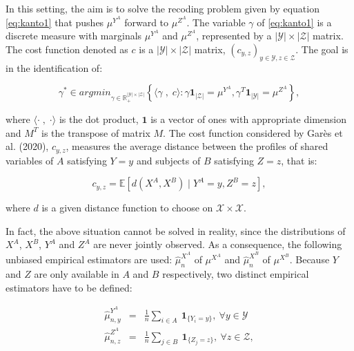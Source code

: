 In this setting, the aim is to solve the recoding problem given by equation \eqref{eq:kanto1} that pushes \(\mu^{Y^A}\) forward to \(\mu^{Z^A}\).
The variable \(\gamma\) of \eqref{eq:kanto1} is a discrete measure with marginals \(\mu^{Y^A}\) and \(\mu^{Z^A}\), represented by a \(|\mathcal{Y}| \times |\mathcal{Z}|\) matrix.
The cost function denoted as \(c\) is a \(|\mathcal{Y}| \times |\mathcal{Z}|\) matrix, \((c_{y,z})_{y\in \mathcal{Y},z\in \mathcal{Z}}\).
The goal is in the identification of:

\begin{equation}
\gamma^*\in argmin_{\gamma \in \mathbb{R}_+^{|\mathcal{Y}| \times |\mathcal{Z}|}}\left\{\langle \gamma  \; ,\; c \rangle : \gamma \mathbf{1}_{|\mathcal{Z}|} = \mu^{Y^A},\gamma^T \mathbf{1}_{|\mathcal{Y}|} = \mu^{Z^A}\right\},
\label{eq:modeldim}
\end{equation}

where \(\langle \cdot \;,\; \cdot \rangle\)
is the dot product, \(\mathbf{1}\) is a vector of ones with appropriate dimension and \(M^T\) is the transpose of matrix \(M\). The cost function considered by Garès et al. (2020), \(c_{y,z}\), measures the average distance between the profiles of shared variables of \(A\) satisfying \(Y=y\) and subjects of \(B\) satisfying \(Z=z\), that is:

\begin{equation}
c_{y,z} = \mathbb{E} \left[d(X^A,X^B) \mid Y^A= y, Z^B= z\right],
\label{eq:costgroup}
\end{equation}

where \(d\) is a given distance function to choose on \(\mathcal{X} \times \mathcal{X}\).

In fact, the above situation cannot be solved in reality, since the distributions of \(X^A\), \(X^B\), \(Y^A\) and \(Z^A\) are never jointly observed. As a consequence, the following unbiased empirical estimators are used: \(\hat{\mu}^{X^A}_n\) of \({\mu}^{X^A}\) and \(\hat{\mu}^{X^B}_n\) of \({\mu}^{X^B}\). Because \(Y\) and \(Z\) are only available in \(A\) and \(B\) respectively, two distinct empirical estimators have to be defined:

\begin{equation}
    \begin{aligned}
        \hat{\mu}^{Y^A}_{n,y} & = & \frac{1}{n}\sum_{i\in A} ~\mathbf{1}_{\{Y_i = y\}},\: \forall y\in\mathcal{Y}\\
        \hat{\mu}^{Z^A}_{n,z} & = & \frac{1}{n}\sum_{j\in B} ~\mathbf{1}_{\{Z_j = z\}},\: \forall z\in \mathcal{Z},
    \end{aligned}
    \label{eq:estimatoroutcomes}
 \end{equation}

